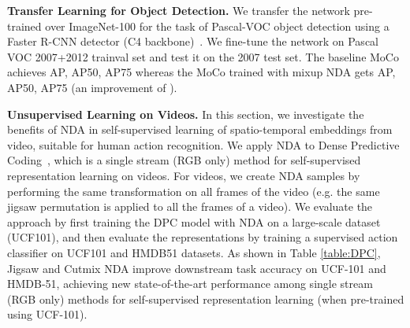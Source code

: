 \documentclass{article} \usepackage{iclr2021_conference,times}
\begin{document}
\begin{table}[!h]
  \caption{Top-1 accuracy results on image recognition w/ and w/o NDA on MoCo-V2.
  }
  \label{table:moco_cifar10}
  \centering
\end{table}

\textbf{Transfer Learning for Object Detection.}
We transfer the network pre-trained over ImageNet-100 for the task of Pascal-VOC object detection using a Faster R-CNN detector (C4 backbone)~\cite{ren2015faster}. We fine-tune the network on Pascal VOC 2007+2012 trainval set and test it on the 2007 test set. The baseline MoCo achieves  AP,  AP50,  AP75 whereas the MoCo trained with mixup NDA gets  AP,  AP50,  AP75 (an improvement of ). 

\textbf{Unsupervised Learning on Videos.}
In this section, we investigate the benefits of NDA in self-supervised learning of spatio-temporal embeddings from video, suitable for human action recognition. We apply NDA to Dense Predictive Coding~\citep{han2019video}, which is a single stream (RGB only) method for self-supervised representation learning on videos. For videos, we create NDA samples by performing the same transformation on all frames of the video (e.g. the same jigsaw permutation is applied to all the frames of a video). We evaluate the approach by first training the DPC model with NDA on a large-scale dataset (UCF101), and then evaluate the representations by training a supervised action classifier on UCF101 and HMDB51 datasets. As shown in Table \ref{table:DPC}, Jigsaw and Cutmix NDA improve downstream task accuracy on UCF-101 and HMDB-51, achieving new state-of-the-art performance among single stream (RGB only) methods for self-supervised representation learning (when pre-trained using UCF-101).
\end{document}
